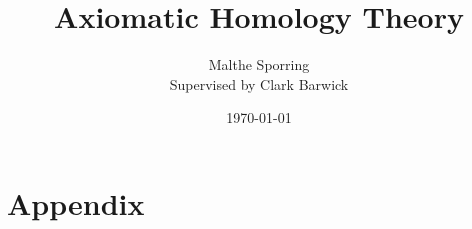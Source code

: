 \documentclass[titlepage,12pt,a4paper]{article}
\title{Axiomatic Homology Theory}
\author{Malthe Sporring\\ Supervised by Clark Barwick}
\date{\today}
\numberwithin{thm}{section}
\theoremstyle{plain}
\theoremstyle{definition}
\begin{document}
\maketitle


\tableofcontents
\newpage











\newpage
\section{Appendix}

\newpage
\end{document}
